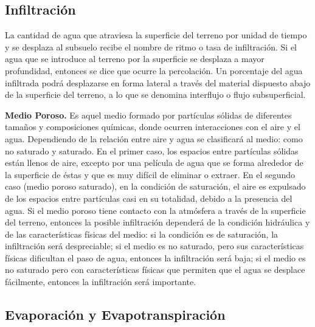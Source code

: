 \documentclass[10pt,a4paper, twoside]{report}
\begin{document}

\subsection{Infiltración}
\label{subsec:infiltracion}

La cantidad de agua que atraviesa la superficie del terreno por unidad de 
tiempo y se desplaza al subsuelo recibe el nombre de ritmo o tasa de 
infiltración. Si el agua que se introduce al terreno por la superficie se 
desplaza a mayor profundidad, entonces se dice que ocurre la percolación. 
Un porcentaje del agua infiltrada podrá desplazarse en forma lateral a través 
del material dispuesto abajo de la superficie del terreno, a lo que se 
denomina interflujo o flujo subsuperficial. 

\textbf{Medio Poroso.} Es aquel medio formado por partículas sólidas de diferentes tamaños y 
composiciones químicas, donde ocurren interacciones con el aire y el agua. 
Dependiendo de la relación entre aire y agua se clasificará al medio: como no 
saturado y saturado. En el primer caso, los espacios entre partículas sólidas 
están llenos de aire, excepto por una película de agua que se forma 
alrededor de la superficie de éstas y que es muy difícil de eliminar o extraer. 
En el segundo caso (medio poroso saturado), en la condición de saturación, 
el aire es expulsado de los espacios entre partículas casi en su totalidad, 
debido a la presencia del agua. 
Si el medio poroso tiene contacto con la atmósfera a través de la superficie 
del terreno, entonces la posible infiltración dependerá de la condición 
hidráulica y de las características físicas del medio: si la condición es de 
saturación, la infiltración será despreciable; si el medio es no saturado, pero 
sus características físicas dificultan el paso de agua, entonces la infiltración 
será baja; si el medio es no saturado pero con características físicas que 
permiten que el agua se desplace fácilmente, entonces la infiltración será 
importante. 

 
\subsection{Evaporación y Evapotranspiración}
\label{subsec:evapYevapotrans}
\end{document}
